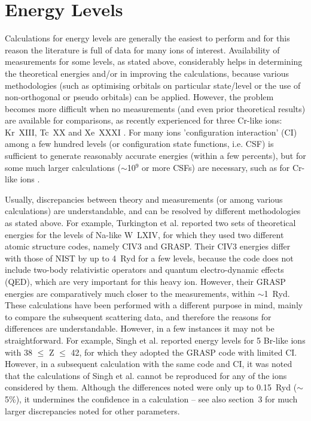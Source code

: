 \documentclass[fleqn]{article}
\begin{document}
\section {Energy Levels}

Calculations for energy levels are generally the easiest to perform and for this reason the literature is full of data for many ions of interest. Availability of measurements for some levels, as stated above, considerably helps in determining the theoretical energies and/or in improving the calculations, because various methodologies (such as optimising orbitals on particular state/level or the use of non-orthogonal or pseudo orbitals) can be applied. However, the problem becomes more difficult when no measurements (and even prior theoretical results) are available for comparisons, as recently experienced for three Cr-like ions: Kr~XIII, Tc~XX and Xe~XXXI \cite{crlike3}.  For many ions 'configuration interaction' (CI) among a few hundred levels (or configuration state functions, i.e. CSF) is sufficient to generate reasonably accurate energies  (within a few percents), but for some  much larger calculations ($\sim$10$^9$ or more CSFs) are necessary, such as for Cr-like ions \cite{crlike3, crlike1, crlike2}. 

Usually, discrepancies between theory and measurements (or among various calculations) are understandable, and can be resolved by different methodologies as stated above. For example, Turkington et al. \cite{turk} reported two sets of theoretical energies for the  levels of Na-like W~LXIV, for which they used two different atomic structure codes, namely CIV3 and GRASP.  Their CIV3 energies differ with those of NIST by up to 4~Ryd for a few levels, because the code does not include two-body relativistic operators  and quantum electro-dynamic effects (QED), which are very important for this heavy ion. However, their GRASP energies are comparatively much closer to the measurements, within $\sim$1~Ryd. These calculations have been performed with a different purpose in mind, mainly to compare the subsequent scattering data, and therefore the reasons for differences are understandable. However,  in a few instances it may not be straightforward. For example, Singh et al. \cite{mmbr} reported energy levels for 5 Br-like ions with 38 $\le$ Z $\le$ 42, for which they adopted the GRASP code with limited CI. However, in a subsequent calculation \cite{brlike1} with the same code and CI, it was noted that the calculations of Singh et al. cannot be reproduced for any of the ions considered by them.  Although the differences noted were only up to 0.15~Ryd ($\sim$5\%), it undermines the confidence in a calculation -- see also section~3 for much larger discrepancies noted for other parameters.
\end{document}

